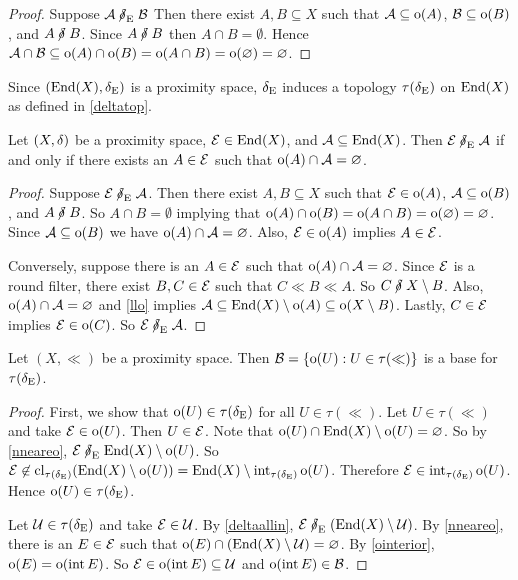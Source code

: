\begin{proof}
		 Suppose \( \cA \nneare \cB \)  Then there exist \( A,B \subseteq X \) such that \( \mathcal{A} \subseteq \operatorname{o}(A) \), \( \mathcal{B} \subseteq \operatorname{o}(B) \), and \( A \nnear B \).  Since \( A \nnear B \) then \( A \cap B = \emptyset \).  Hence \( \mathcal{A} \cap \mathcal{B} \subseteq \operatorname{o}(A) \cap \operatorname{o}(B) = \operatorname{o}(A \cap B) = \operatorname{o}(\varnothing) = \varnothing \).
\end{proof}

\begin{remark}
	Since \( (\operatorname{End}(X),\mathrel{\delta_\text{E}}) \) is a proximity space, \( \mathrel{\delta_\text{E}} \) induces a topology \( \tau(\mathrel{\delta_\text{E}}) \) on \( \operatorname{End}(X) \) as defined in \ref{deltatop}.
\end{remark}

\begin{lemma}
	\label{nneareo}
	Let \( (X,\mathord{\delta}) \) be a proximity space, \( \mathcal{E} \in \operatorname{End}(X) \), and \( \mathcal{A} \subseteq \operatorname{End}(X) \).  Then \( \cE \nneare \cA \) if and only if there exists an \( A \in \mathcal{E} \) such that \( \operatorname{o}(A) \cap \mathcal{A} = \varnothing \).
\end{lemma}
\begin{proof}
	Suppose \( \cE \nneare \cA \).  Then there exist \( A,B \subseteq X \) such that \( \mathcal{E} \in \operatorname{o}(A) \), \( \mathcal{A} \subseteq \operatorname{o}(B) \), and \( A \nnear B \).  So \( A \cap B = \emptyset \) implying that \( \operatorname{o}(A) \cap \operatorname{o}(B) = \operatorname{o}(A \cap B) = \operatorname{o}(\varnothing) = \varnothing \).  Since \( \mathcal{A} \subseteq \operatorname{o}(B) \) we have \( \operatorname{o}(A) \cap \mathcal{A} = \varnothing \).  Also, \( \mathcal{E} \in \operatorname{o}(A) \) implies \( A \in \mathcal{E} \).
	
	Conversely, suppose there is an \( A \in \mathcal{E} \) such that \( \operatorname{o}(A) \cap \mathcal{A} = \varnothing \).  Since \( \mathcal{E} \) is a round filter, there exist \( B,C \in \mathcal{E} \) such that \( C \ll B \ll A \).  So \( C \nnear X \setminus B \).  Also, \( \operatorname{o}(A) \cap \mathcal{A} = \varnothing \) and \ref{llo} implies \( \mathcal{A} \subseteq \operatorname{End}(X) \setminus \operatorname{o}(A) \subseteq \operatorname{o}(X \setminus B) \).  Lastly, \( C \in \mathcal{E} \) implies \( \mathcal{E} \in \operatorname{o}(C) \).  So \( \cE \nneare \cA \).
\end{proof}

\begin{theorem}
	\label{Endbase}
	Let \( (X,\ll) \) be a proximity space.  Then \( \mathcal{B} = \{ \operatorname{o}(U): U \in \tau(\ll) \} \) is a base for \( \tau(\mathord{\delta}_\text{E}) \).
\end{theorem}
\begin{proof}
	First, we show that \( \operatorname{o}(U) \in \tau(\mathord{\delta}_\text{E}) \) for all \( U \in \tau(\ll) \).  Let \( U \in \tau(\ll) \) and take \( \mathcal{E} \in \operatorname{o}(U) \).  Then \( U \in \mathcal{E} \).  Note that \( \operatorname{o}(U) \cap \operatorname{End}(X) \setminus \operatorname{o}(U) = \varnothing \).  So by \ref{nneareo}, \( \cE \nneare \End(X) \setminus \o(U) \).  So \( \mathcal{E} \not\in \operatorname{cl}_{\tau(\mathord{\delta}_\text{E})} (\operatorname{End}(X) \setminus \operatorname{o}(U)) = \operatorname{End}(X) \setminus \operatorname{int}_{\tau(\mathord{\delta}_\text{E})} \operatorname{o}(U) \).  Therefore \( \mathcal{E} \in \operatorname{int}_{\tau(\mathord{\delta}_\text{E})} \operatorname{o}(U) \).  Hence \( \operatorname{o}(U) \in \tau(\mathord{\delta}_\text{E}) \).
	
	Let \( \mathcal{U} \in \tau(\mathrel{\delta_\text{E}}) \) and take \( \mathcal{E} \in \mathcal{U} \).  By \ref{deltaallin}, \( \cE \nneare (\End(X) \setminus \cU) \).  By \ref{nneareo}, there is an \( E \in \mathcal{E} \) such that \( \operatorname{o}(E) \cap (\operatorname{End}(X) \setminus \mathcal{U}) = \varnothing \).  By \ref{ointerior}, \( \operatorname{o}(E) = \operatorname{o}(\operatorname{int}{E}) \).  So \( \mathcal{E} \in \operatorname{o}(\operatorname{int}{E}) \subseteq \mathcal{U} \) and \( \operatorname{o}(\operatorname{int}{E}) \in \mathcal{B} \).
\end{proof}

